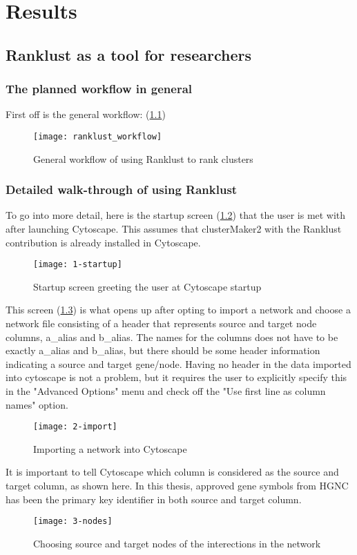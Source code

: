 \part{Results}
\label{pa:results}
\chapter{Ranklust as a tool for researchers}
\section{The planned workflow in general}
First off is the general workflow: (\ref{fig:ranklust-workflow})
\begin{figure}[H]
    \texttt{[image: ranklust\_workflow]}
    \caption{General workflow of using Ranklust to rank clusters}
    \label{fig:ranklust-workflow}
\end{figure}

\section{Detailed walk-through of using Ranklust}
To go into more detail, here is the startup screen (\ref{fig:startup}) that the
user is met with after launching Cytoscape. This assumes that clusterMaker2 with
the Ranklust contribution is already installed in Cytoscape.
\begin{figure}[H]
    \texttt{[image: 1-startup]}
    \caption{Startup screen greeting the user at Cytoscape startup}
    \label{fig:startup}
\end{figure}

This screen (\ref{fig:import}) is what opens up after opting to import a network
and choose a network file consisting of a header that represents source and
target node columns, a\_alias and b\_alias. The names for the columns does not
have to be exactly a\_alias and b\_alias, but there should be some header
information indicating a source and target gene/node. Having no header in the
data imported into cytoscape is not a problem, but it requires the user to
explicitly specify this in the "Advanced Options" menu and check off the "Use
first line as column names" option.
\begin{figure}[H]
    \texttt{[image: 2-import]}
    \caption{Importing a network into Cytoscape}
    \label{fig:import}
\end{figure}

It is important to tell Cytoscape which column is considered as the source and
target column, as shown here. In this thesis, approved gene symbols from HGNC
has been the primary key identifier in both source and target column.
\begin{figure}[H]
    \texttt{[image: 3-nodes]}
    \caption{Choosing source and target nodes of the interections in the network}
    \label{fig:nodes}
\end{figure}


